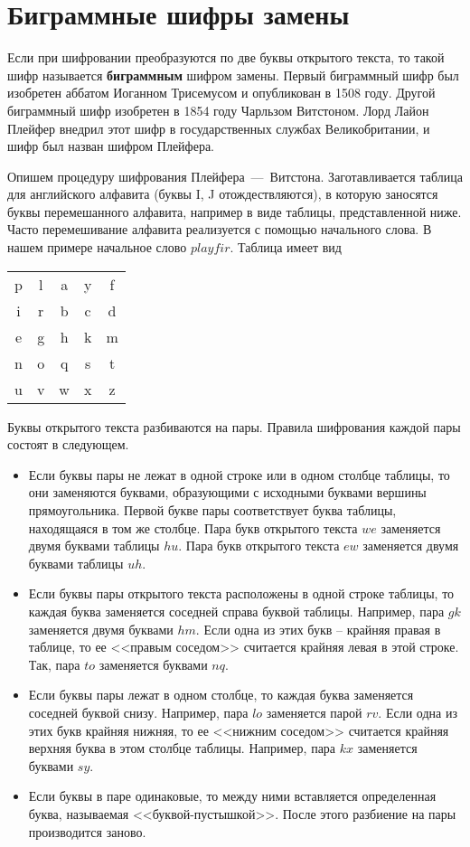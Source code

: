 \section{Биграммные шифры замены}

Если при шифровании преобразуются по две буквы открытого текста, то такой шифр называется \textbf{биграммным} шифром замены. Первый биграммный шифр был изобретен аббатом Иоганном Трисемусом и опубликован в 1508 году. Другой биграммный шифр изобретен в 1854 году Чарльзом Витстоном. Лорд Лайон Плейфер внедрил этот шифр в государственных службах Великобритании, и шифр был назван шифром Плейфера.

Опишем процедуру шифрования Плейфера~---~Витстона. Заготавливается таблица для английского алфавита (буквы I, J отождествляются), в которую заносятся буквы перемешанного алфавита, например в виде таблицы, представленной ниже. Часто перемешивание алфавита реализуется с помощью начального слова. В нашем примере начальное слово $playfir$. Таблица имеет вид

\begin{center}
    \begin{tabular}{ccccc}
        p & l & a & y & f  \\
        i & r & b & c & d  \\
        e & g & h & k & m  \\
        n & o & q & s & t  \\
        u & v & w & x & z  \\
    \end{tabular}
\end{center}

Буквы открытого текста разбиваются на пары. Правила шифрования каждой пары состоят в следующем.

\begin{itemize}
    \item Если буквы пары не лежат в одной строке или в одном столбце таблицы, то они заменяются буквами, образующими с исходными буквами вершины прямоугольника. Первой букве пары соответствует буква таблицы, находящаяся в том же столбце. Пара букв открытого текста $we$ заменяется двумя буквами таблицы $hu$. Пара букв открытого текста $ew$ заменяется двумя буквами таблицы $uh$.
    \item Если буквы пары открытого текста расположены в одной строке таблицы, то каждая буква заменяется соседней справа буквой таблицы. Например, пара $gk$  заменяется двумя буквами $hm$. Если одна из этих букв -- крайняя правая в таблице, то ее <<правым соседом>> считается крайняя левая в этой строке. Так, пара $to$ заменяется буквами $nq$.
    \item Если буквы пары лежат в одном столбце, то каждая буква заменяется соседней буквой снизу. Например, пара $lo$ заменяется парой $rv$. Если одна из этих букв крайняя нижняя, то ее <<нижним соседом>> считается крайняя верхняя буква в этом столбце таблицы. Например, пара $kx$ заменяется буквами $sy$.
    \item Если буквы в паре одинаковые, то между ними вставляется определенная буква, называемая <<буквой-пустышкой>>. После этого разбиение на пары производится заново.
\end{itemize}

